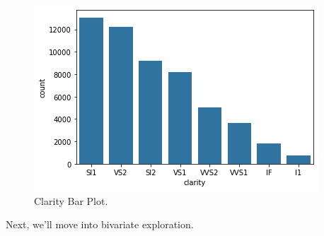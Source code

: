 \begin{figure}
	\includegraphics{images/figure50.png}
	\caption{Clarity Bar Plot.}\label{fig:figure50}
\end{figure}

\newpage
Next, we'll move into bivariate exploration.

